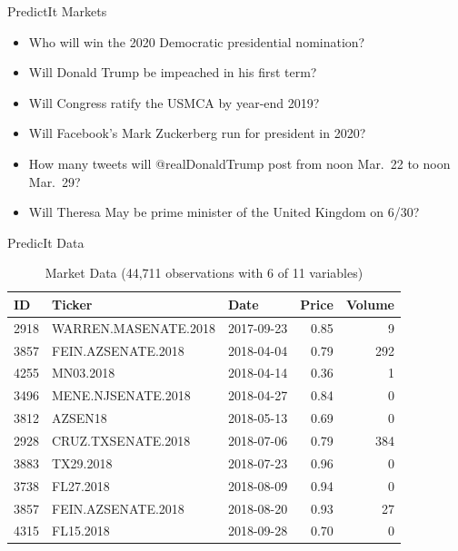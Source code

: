 \documentclass[
  ignorenonframetext,
]{beamer}
\providecommand{\tightlist}{%
  \setlength{\itemsep}{0pt}\setlength{\parskip}{0pt}}
\begin{document}
\begin{frame}{PredictIt Markets}
\protect\hypertarget{predictit-markets}{}

\begin{itemize}
\tightlist
\item
  Who will win the 2020 Democratic presidential nomination?
\item
  Will Donald Trump be impeached in his first term?
\item
  Will Congress ratify the USMCA by year-end 2019?
\item
  Will Facebook's Mark Zuckerberg run for president in 2020?
\item
  How many tweets will @realDonaldTrump post from noon Mar.~22 to noon
  Mar.~29?
\item
  Will Theresa May be prime minister of the United Kingdom on 6/30?
\end{itemize}

\end{frame}

\begin{frame}{PredicIt Data}
\protect\hypertarget{predicit-data}{}

\begin{table}

\caption{\label{tab:market_data}Market Data (44,711 observations with 6 of 11 variables)}
\centering
\begin{tabular}[t]{l|l|l|r|r}
\hline
ID & Ticker & Date & Price & Volume\\
\hline
2918 & WARREN.MASENATE.2018 & 2017-09-23 & 0.85 & 9\\
\hline
3857 & FEIN.AZSENATE.2018 & 2018-04-04 & 0.79 & 292\\
\hline
4255 & MN03.2018 & 2018-04-14 & 0.36 & 1\\
\hline
3496 & MENE.NJSENATE.2018 & 2018-04-27 & 0.84 & 0\\
\hline
3812 & AZSEN18 & 2018-05-13 & 0.69 & 0\\
\hline
2928 & CRUZ.TXSENATE.2018 & 2018-07-06 & 0.79 & 384\\
\hline
3883 & TX29.2018 & 2018-07-23 & 0.96 & 0\\
\hline
3738 & FL27.2018 & 2018-08-09 & 0.94 & 0\\
\hline
3857 & FEIN.AZSENATE.2018 & 2018-08-20 & 0.93 & 27\\
\hline
4315 & FL15.2018 & 2018-09-28 & 0.70 & 0\\
\hline
\end{tabular}
\end{table}

\end{frame}
\end{document}
